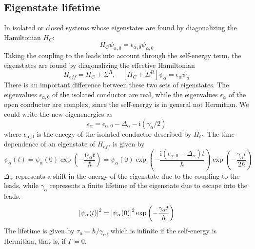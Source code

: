 \documentclass[11pt,a4paper]{book}
\theoremstyle{plain}
\theoremstyle{definition}
\theoremstyle{remark}
\newcommand{\ii}{\mathrm{i}}                      %
\begin{document}
\subsection{Eigenstate lifetime}
In isolated or closed systems whose eigenstates are found by diagonalizing the Hamiltonian $H_C$:
\begin{equation}
    H_C \psi_{\alpha,0} = \epsilon_{\alpha,0} \psi_{\alpha,0}
\end{equation}
Taking the coupling to the leads into account through the self-energy term, the eigenstates are found by diagonalizing the effective Hamiltonian
\begin{equation}
        H_{eff} = H_C + \Sigma^R,\quad \left[ H_C + \Sigma^R \right]\psi_\alpha = \epsilon_\alpha \psi_\alpha
\end{equation}
There is an important difference between these two sets of eigenstates. The eigenvalues $\epsilon_{\alpha,0}$ of the isolated conductor are real, while the eigenvalues $\epsilon_\alpha$ of the open conductor are complex, since the self-energy is in general not Hermitian. We could write the new eigenenergies as 
\begin{equation}
    \epsilon_\alpha = \epsilon_{\alpha,0} - \Delta_\alpha - \ii (\gamma_\alpha/2)
\end{equation}
where $\epsilon_{\alpha,0}$ is the eneegy of the isolated conductor described by $H_C$. The time dependence of an eigenstate of $H_{eff}$ is given by
\begin{equation}
    \psi_\alpha(t) = \psi_\alpha(0) \exp\left(-\frac{\ii \epsilon_\alpha t}{\hbar}\right) = \psi_\alpha(0) \exp\left(-\frac{\ii (\epsilon_{\alpha,0} - \Delta_\alpha) t}{\hbar}\right) \exp\left(-\frac{\gamma_\alpha t}{2 \hbar}\right)
\end{equation}
$\Delta_\alpha$ represents a shift in the energy of the eigenstate due to the coupling to the leads, while $\gamma_\alpha$ represents a finite lifetime of the eigenstate due to escape into the leads. 
\begin{equation}
    \abs{\psi_\alpha(t)}^2 = \abs{\psi_\alpha(0)}^2 \exp\left(-\frac{\gamma_\alpha t}{\hbar}\right)
\end{equation}
The lifetime is given by $\tau_\alpha = \hbar/\gamma_\alpha$, which is infinite if the self-energy is Hermitian, that is, if $\Gamma = 0$.
\end{document}
